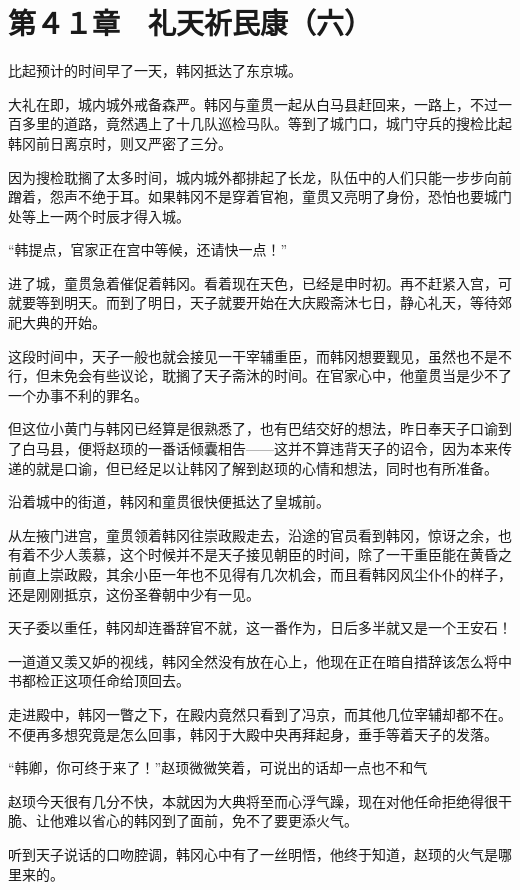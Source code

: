 \section{第４１章　礼天祈民康（六）}

比起预计的时间早了一天，韩冈抵达了东京城。

大礼在即，城内城外戒备森严。韩冈与童贯一起从白马县赶回来，一路上，不过一百多里的道路，竟然遇上了十几队巡检马队。等到了城门口，城门守兵的搜检比起韩冈前日离京时，则又严密了三分。

因为搜检耽搁了太多时间，城内城外都排起了长龙，队伍中的人们只能一步步向前蹭着，怨声不绝于耳。如果韩冈不是穿着官袍，童贯又亮明了身份，恐怕也要城门处等上一两个时辰才得入城。

“韩提点，官家正在宫中等候，还请快一点！”

进了城，童贯急着催促着韩冈。看着现在天色，已经是申时初。再不赶紧入宫，可就要等到明天。而到了明日，天子就要开始在大庆殿斋沐七日，静心礼天，等待郊祀大典的开始。

这段时间中，天子一般也就会接见一干宰辅重臣，而韩冈想要觐见，虽然也不是不行，但未免会有些议论，耽搁了天子斋沐的时间。在官家心中，他童贯当是少不了一个办事不利的罪名。

但这位小黄门与韩冈已经算是很熟悉了，也有巴结交好的想法，昨日奉天子口谕到了白马县，便将赵顼的一番话倾囊相告——这并不算违背天子的诏令，因为本来传递的就是口谕，但已经足以让韩冈了解到赵顼的心情和想法，同时也有所准备。

沿着城中的街道，韩冈和童贯很快便抵达了皇城前。

从左掖门进宫，童贯领着韩冈往崇政殿走去，沿途的官员看到韩冈，惊讶之余，也有着不少人羡慕，这个时候并不是天子接见朝臣的时间，除了一干重臣能在黄昏之前直上崇政殿，其余小臣一年也不见得有几次机会，而且看韩冈风尘仆仆的样子，还是刚刚抵京，这份圣眷朝中少有一见。

天子委以重任，韩冈却连番辞官不就，这一番作为，日后多半就又是一个王安石！

一道道又羡又妒的视线，韩冈全然没有放在心上，他现在正在暗自措辞该怎么将中书都检正这项任命给顶回去。

走进殿中，韩冈一瞥之下，在殿内竟然只看到了冯京，而其他几位宰辅却都不在。不便再多想究竟是怎么回事，韩冈于大殿中央再拜起身，垂手等着天子的发落。

“韩卿，你可终于来了！”赵顼微微笑着，可说出的话却一点也不和气

赵顼今天很有几分不快，本就因为大典将至而心浮气躁，现在对他任命拒绝得很干脆、让他难以省心的韩冈到了面前，免不了要更添火气。

听到天子说话的口吻腔调，韩冈心中有了一丝明悟，他终于知道，赵顼的火气是哪里来的。

